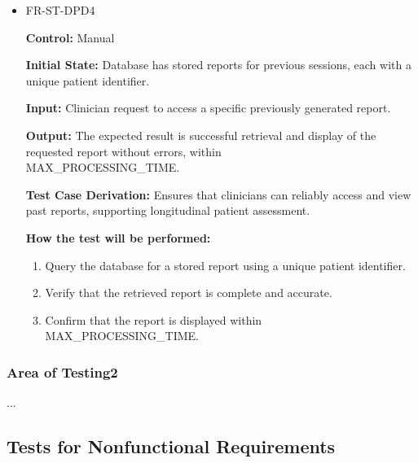 \documentclass[12pt, titlepage]{article}
\begin{document}
\begin{itemize}
  \item FR-ST-DPD4
  \begin{mdframed}[linewidth=0.5mm]
      \textbf{Control:} Manual \par
      \textbf{Initial State:} Database has stored reports for previous sessions, each with a unique patient identifier. \par
      \textbf{Input:} Clinician request to access a specific previously generated report. \par
      \textbf{Output:} The expected result is successful retrieval and display of the requested report without errors, within \\MAX\_PROCESSING\_TIME. \par
      \textbf{Test Case Derivation:} Ensures that clinicians can reliably access and view past reports, supporting longitudinal patient assessment.\par
      \textbf{How the test will be performed:}
      \begin{enumerate}[noitemsep]
        \item Query the database for a stored report using a unique patient identifier. 
        \item Verify that the retrieved report is complete and accurate. 
        \item Confirm that the report is displayed within \\MAX\_PROCESSING\_TIME.
      \end{enumerate}
  \end{mdframed}

\end{itemize}

\subsubsection{Area of Testing2}

...

\subsection{Tests for Nonfunctional Requirements}


\end{document}
